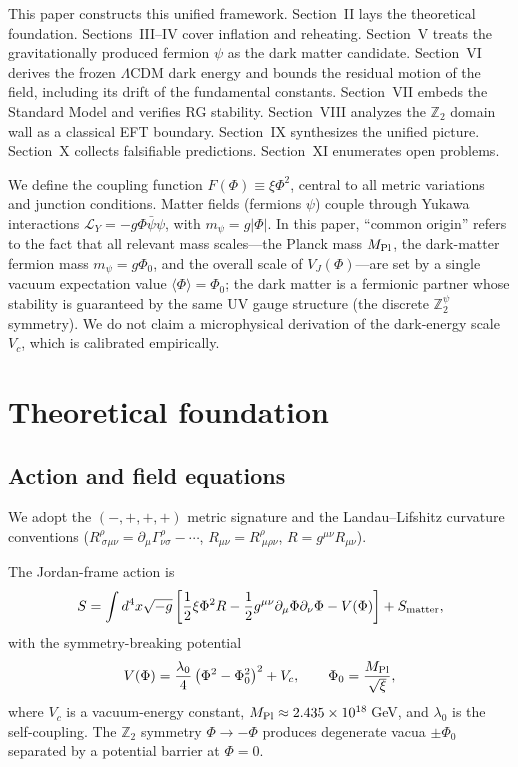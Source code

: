 \documentclass[pdflatex,sn-mathphys-num]{sn-jnl}
\newcommand{\MP}{M_{\rm Pl}}
\newcommand{\Ztwo}{\mathbb{Z}_2}
\newcommand{\Ztwopsi}{\Ztwo^{\psi}}
\newcommand{\PhiV}{\Phi_0}
\newcommand{\vev}[1]{\langle #1\rangle}
\theoremstyle{thmstyleone}
\begin{document}
This paper constructs this unified framework. Section~II lays the theoretical foundation. Sections~III--IV cover inflation and reheating. Section~V treats the gravitationally produced fermion $\psi$ as the dark matter candidate. Section~VI derives the frozen $\Lambda$CDM dark energy and bounds the residual motion of the field, including its drift of the fundamental constants. Section~VII embeds the Standard Model and verifies RG stability. Section~VIII analyzes the $\Ztwo$ domain wall as a classical EFT boundary. Section~IX synthesizes the unified picture. Section~X collects falsifiable predictions. Section~XI enumerates open problems.

We define the coupling function $F(\Phi)\equiv\xi\Phi^2$, central to all metric variations and junction conditions. Matter fields (fermions $\psi$) couple through Yukawa interactions $\mathcal{L}_Y=-g\Phi\bar\psi\psi$, with $m_\psi=g|\Phi|$. In this paper, ``common origin'' refers to the fact that all relevant mass scales---the Planck mass $\MP$, the dark-matter fermion mass $m_\psi=g\PhiV$, and the overall scale of $V_J(\Phi)$---are set by a single vacuum expectation value $\vev{\Phi}=\PhiV$; the dark matter is a fermionic partner whose stability is guaranteed by the same UV gauge structure (the discrete $\Ztwopsi$ symmetry). We do not claim a microphysical derivation of the dark-energy scale $V_c$, which is calibrated empirically.

\section{Theoretical foundation}

\subsection{Action and field equations}

We adopt the $(-,+,+,+)$ metric signature and the Landau--Lifshitz curvature conventions ($R^\rho_{\ \sigma\mu\nu}=\partial_\mu\Gamma^\rho_{\nu\sigma}-\cdots$, $R_{\mu\nu}=R^\rho_{\ \mu\rho\nu}$, $R=g^{\mu\nu}R_{\mu\nu}$).

The Jordan-frame action is
\begin{equation}
S=\int d^4x\sqrt{-g}\left[\frac12\xi\Phi^2R-\frac12 g^{\mu\nu}\partial_\mu\Phi\partial_\nu\Phi-V(\Phi)\right]+S_{\rm matter},
\label{eq:action}
\end{equation}
with the symmetry-breaking potential
\begin{equation}
V(\Phi)=\frac{\lambda_0}{4}\left(\Phi^2-\PhiV^2\right)^2+V_c,
\qquad
\PhiV=\frac{\MP}{\sqrt{\xi}},
\label{eq:potential}
\end{equation}
where $V_c$ is a vacuum-energy constant, $\MP\approx2.435\times10^{18}\,$GeV, and $\lambda_0$ is the self-coupling. The $\Ztwo$ symmetry $\Phi\to-\Phi$ produces degenerate vacua $\pm\PhiV$ separated by a potential barrier at $\Phi=0$.
\end{document}
